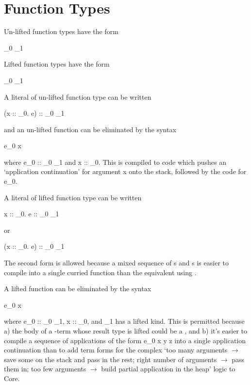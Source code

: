 \documentclass{report}
\newcommand\crkwd[1]{\hskwd{"#1}}
\newcommand\lift[1]{\left\lfloor#1\right\rfloor}
\newcommand\crlambda{\hskwd{\lambda}}
\newcommand\crllambda{\crkwd{l\lambda}}
\begin{document}
\section{Function Types}

Un-lifted function types have the form
\begin{haskell} \tau_0 \rightarrow \tau_1 \end{haskell}
Lifted function types have the form
\begin{haskell} \lift{\tau_0 \rightarrow \tau_1} \end{haskell}

A literal of un-lifted function type can be written
\begin{haskell} (\crlambda x :: \tau_0. e) :: \tau_0 \rightarrow \tau_1 \end{haskell}
and an un-lifted function can be eliminated by the syntax
\begin{haskell} e_0 x \end{haskell}
where \<e_0 :: \tau_0 \rightarrow \tau_1\> and \<x :: \tau_0\>.
This is compiled to code which pushes an `application continuation' for argument \<x\> onto the stack,
followed by the code for \<e_0\>.

A literal of lifted function type can be written
\begin{haskell} \lift{\crlambda x :: \tau_0. e} :: \lift{\tau_0 \rightarrow \tau_1} \end{haskell}
or
\begin{haskell} (\crllambda x :: \tau_0. e) :: \lift{\tau_0 \rightarrow \tau_1} \end{haskell}
The second form is allowed because a mixed sequence of \<\crlambda\>s and \<\crllambda\>s
is easier to compile into a single curried function than the equivalent using \<\lift{}\>.

A lifted function can be eliminated by the syntax
\begin{haskell} e_0 x \end{haskell}
where \<e_0 :: \tau_0 \rightarrow \tau_1\>, \<x :: \tau_0\>, and \<\tau_1\> has a lifted kind.
This is permitted because
a) the body of a \<\crlambda\>-term whose result type is lifted could be a \<\crllambda\>, and
b) it's easier to compile a sequence of applications of the form \<e_0 x y z\> into a single application continuation
than to add term forms for the complex
`too many arguments $\rightarrow$ save some on the stack and pass in the rest;
right number of arguments $\rightarrow$ pass them in;
too few arguments $\rightarrow$ build partial application in the heap'
logic to Core.
\end{document}
